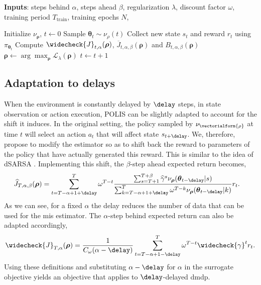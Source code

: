 \begin{algorithm}[t]
\caption{Lifelong learning with POLIS}
\label{alg:cap}
\textbf{Inputs}: steps behind $\alpha$, steps ahead $\beta$, regularization $\lambda$, discount factor $\omega$, training period $T_{\text{train}}$, training epochs $N$,
\begin{algorithmic}[1]
\STATE Initialize $\nu_{\boldsymbol{\rho}}$, $t \gets 0$
    \STATE Sample $\boldsymbol{\theta}_t\sim\nu_{\rho}(t)$
    \STATE Collect new state $s_t$ and reward $r_t$ using $\pi_{\boldsymbol{\theta}_t}$
            \STATE Compute $\widecheck{J}_{t,\alpha}({\boldsymbol{\rho}})$,  $\overline{J}_{t,\alpha,\beta}({\boldsymbol{\rho}})$ and  $B_{t,\alpha,\beta}(\boldsymbol{\rho})$ 
            \STATE $\boldsymbol{\rho} \gets \arg\max_{\boldsymbol{\rho}} \mathcal{L}_{\lambda}(\boldsymbol{\rho})$
         \ENDFOR
    \ENDIF
    \STATE $t \gets t+1$
\ENDWHILE
\end{algorithmic}
\end{algorithm}



\subsection{Adaptation to delays}
\label{subsec:extension_delay_polis}
When the environment is constantly delayed by $\delay$ steps, in state observation or action execution, POLIS can be slightly adapted to account for the shift it induces.
In the original setting, the policy sampled by $\nu_{\vectorialform{\rho}}$ at time $t$ will select an action $a_t$ that will affect state $s_{t+\delay}$.
We, therefore, propose to modify the estimator so as to shift back the reward to parameters of the policy that have actually generated this reward.
This is similar to the idea of dSARSA \cite{schuitema2010control}.
Implementing this shift, the $\beta$-step ahead expected return becomes,
\begin{align*}
    \widehat{J}_{T,\alpha,\beta}({\boldsymbol\rho}) 
    & = \sum_{t=T-\alpha+1+\delay}^{T} \omega^{T-t} \frac{\sum_{s=T+1}^{T+\beta} \widehat{\gamma}^s \nu_{\boldsymbol\rho}(\boldsymbol\theta_{t-\delay}\vert s)}{\sum_{k=T-\alpha+1+\delay}^T \omega^{T-k} \nu_{\boldsymbol\rho}(\boldsymbol\theta_{t-\delay}\vert k)} r_{t}.
\end{align*}
As we can see, for a fixed $\alpha$ the delay reduces the number of data that can be used for the \gls{mis} estimator.
The $\alpha$-step behind expected return can also be adapted accordingly,
\begin{align*}
    \widecheck{J}_{T,\alpha}({\boldsymbol\rho}) = \frac{1}{C_\omega(\alpha-\delay)} \sum_{t=T-\alpha+1-\delay}^{T} \omega^{T-t}  \widecheck{\gamma}^t r_{t}.
\end{align*}
Using these definitions and substituting $\alpha-\delay$ for $\alpha$ in the surrogate objective yields an objective that applies to $\delay$-delayed \gls{dmdp}. 